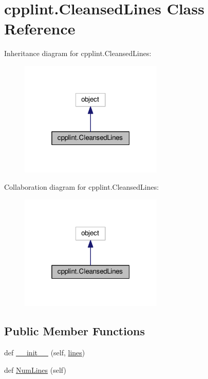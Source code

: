 \hypertarget{classcpplint_1_1_cleansed_lines}{}\section{cpplint.\+Cleansed\+Lines Class Reference}
\label{classcpplint_1_1_cleansed_lines}


Inheritance diagram for cpplint.\+Cleansed\+Lines\+:
\nopagebreak
\begin{figure}[H]
\begin{center}
\leavevmode
\includegraphics[width=193pt]{classcpplint_1_1_cleansed_lines__inherit__graph}
\end{center}
\end{figure}


Collaboration diagram for cpplint.\+Cleansed\+Lines\+:
\nopagebreak
\begin{figure}[H]
\begin{center}
\leavevmode
\includegraphics[width=193pt]{classcpplint_1_1_cleansed_lines__coll__graph}
\end{center}
\end{figure}
\subsection*{Public Member Functions}
\begin{DoxyCompactItemize}
\item 
def \hyperlink{classcpplint_1_1_cleansed_lines_ad2bc06d9697e2bbfbc7e6b50878c8c8f}{\+\_\+\+\_\+init\+\_\+\+\_\+} (self, \hyperlink{classcpplint_1_1_cleansed_lines_a9cd74bd010da1610a46322d6821bd06a}{lines})
\item 
def \hyperlink{classcpplint_1_1_cleansed_lines_a26a7eff70493d64d58d16f4a406c7ee9}{Num\+Lines} (self)
\end{DoxyCompactItemize}
